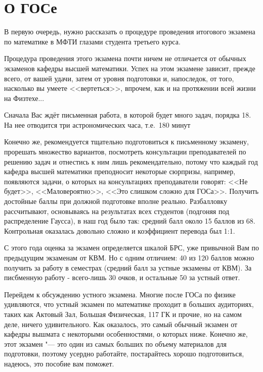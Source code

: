 \chapter*{О ГОСе\footnotemark}

В первую очередь, нужно рассказать о процедуре проведения итогового экзамена по математике в МФТИ глазами студента третьего курса. 

Процедура проведения этого экзамена почти ничем не отличается от обычных экзаменов кафедры высшей математики. 
Успех на этом экзамене зависит, прежде всего, от вашей удачи, затем от уровня подготовки и, напоследок, от того, насколько вы умеете <<вертеться>>, впрочем, как и на протяжении всей жизни на Физтехе...

Сначала Вас ждёт письменная работа, в которой будет много задач, порядка 18. На нее отводится три астрономических часа, т.е.~180 минут

Конечно же, рекомендуется тщательно подготовиться к письменному экзамену, прорешать множество вариантов, посмотреть консультации преподавателей по решению задач и отнестись к ним лишь рекомендательно, потому что каждый год кафедра высшей математики преподносит некоторые сюрпризы, например, появляются задачи, о которых на консультациях преподаватели говорят: <<Не будет>>, <<Маловероятно>>, <<Это слишком сложно для ГОСа>>. Получить достойные баллы при должной подготовке вполне реально. Разбалловку рассчитывают, основываясь на результатах всех студентов (подгоняя под распределение Гаусса), в наш год было так: средний балл около 15 баллов из 68. Контрольная оказалась довольно сложно и коэффициент перевода был 1:1.

С этого года оценка за экзамен определяется шкалой БРС, уже привычной Вам по предыдущим экзаменам от КВМ. Но с одним отличием: 40 из 120 баллов можно получить за работу в семестрах (средний балл за устные экзамены от КВМ). За писбменную работу - всего-лишь 30 очков, и остальные 50 за устный ответ.

Перейдем к обсуждению устного экзамена. Многие после ГОСа по физике удивляются, что устный экзамен по математике проходит в больших аудиториях, таких как Актовый Зал, Большая Физическая, 117 ГК и прочие, но на самом деле, ничего удивительного. Как оказалось, это самый обычный экзамен от кафедры вышмата с некоторыми особенностями, о которых ниже. Конечно же, этот экзамен "--- это один из самых больших по объему материалов для подготовки, поэтому усердно работайте, постарайтесь хорошо подготовиться, надеюсь, это пособие вам поможет.


